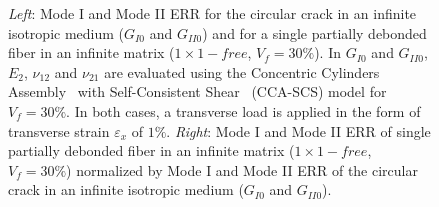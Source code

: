 \documentclass[review]{elsarticle}
\begin{document}
\begin{figure}[!h]
\caption{\textit{Left}: Mode I and Mode II ERR for the circular crack in an infinite isotropic medium ($G_{I0}$ and $G_{II0}$) and for a single partially debonded fiber in an infinite matrix ($1\times 1-free$, $V_{f}=30\%$). In $G_{I0}$ and $G_{II0}$, $E_{2}$, $\nu_{12}$ and $\nu_{21}$ are evaluated using the Concentric Cylinders Assembly~\cite{Hashin1983} with Self-Consistent Shear~\cite{Christensen1979} (CCA-SCS) model for $V_{f}=30\%$. In both cases, a transverse load is applied in the form of transverse strain $\varepsilon_{x}$ of $1\%$. \textit{Right}: Mode I and Mode II ERR of single partially debonded fiber in an infinite matrix ($1\times 1-free$, $V_{f}=30\%$) normalized by Mode I and Mode II ERR of the circular crack in an infinite isotropic medium ($G_{I0}$ and $G_{II0}$).}\label{fig:comparescalingVf30}
\end{figure}
\end{document}
